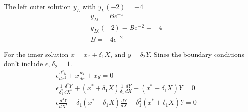 \documentclass{/home/janmebows/Documents/LatexTemplates/myassignment}
\begin{document}
\begin{enumerate}
	
	The left outer solution $y_L$ with $y_L(-2) =-4$
	\begin{align*}
	y_{L0} = Be^{-x}\\
	y_{L0}(-2) = Be^{-2} = -4\\
	B = -4e^{-2}
	\end{align*}

	For the inner solution $x = x_* + \delta_1 X$, and $y = \delta_2 Y$. Since the boundary conditions don't include $\epsilon$, $\delta_2 =1$.
	\begin{align*}
		\epsilon \frac{d^2y}{dx^2} + x\frac{dy}{dx} + xy =0\\
		\epsilon \frac{1}{\delta_1^2}\frac{d^2Y}{dX^2} + (x^* + \delta_1X)\frac{1}{\delta_1}\frac{dY}{dX} + (x^* +\delta_1 X)Y =0\\
		\epsilon \frac{d^2Y}{dX^2} + \delta_1 (x^* + \delta_1 X)\frac{dY}{dX} + \delta_1^2 (x^* + \delta_1X)Y = 0
	\end{align*}
	





\end{enumerate}
\end{document}
